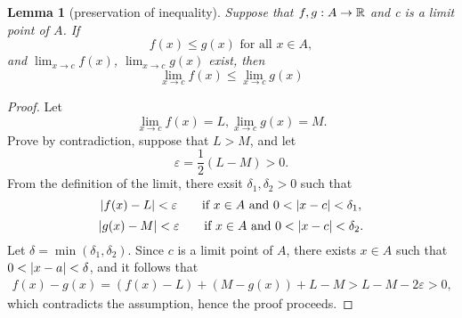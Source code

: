 \documentclass{iitthesis}
\newtheorem{lemma}[theorem]{Lemma}
\theoremstyle{definition}
\begin{document}
\begin{lemma}[preservation of inequality]\label{presofineq}
Suppose that $f, g: A \to \mathbb{R}$ and c is a limit point of $A$. If
\begin{equation*}
f(x) \leq g(x) \text{ for all } x\in A,
\end{equation*}
and $\lim_{x\to c}f(x)$, $\lim_{x\to c} g(x)$ exist, then
$$\lim_{x\to c}f(x)\leq\lim_{x\to c} g(x)$$
\end{lemma}
\begin{proof}
Let
\begin{equation*}
\lim_{x \to c} f(x) =L, \lim_{x \to c}g(x) = M.
\end{equation*}
Prove by contradiction, suppose that $L >M$, and let
$$\varepsilon =\frac12(L-M) >0.$$
From the definition of the limit, there exsit $\delta_1, \delta_2>0$ such that
\begin{equation*}
\left \lvert f(x)-L \right \rvert<\varepsilon \quad \quad \text{if } x \in A \text{ and } 0<\left \lvert x-c \right \rvert<\delta_1,
\end{equation*}
\begin{equation*}
\left \lvert g(x)-M \right \rvert<\varepsilon \quad \quad \text{if } x \in A \text{ and } 0<\left \lvert x-c \right \rvert<\delta_2.
\end{equation*}
Let $\delta=\min(\delta_1,\delta_2)$. Since $c$ is a limit point of $A$, there exists $x \in A$ such that $0<\left \lvert x-a \right \rvert<\delta$, and it follows that
\begin{align*}
f(x)-g(x) = (f(x)-L)+(M-g(x))+L-M >L-M-2\varepsilon>0,
\end{align*}
which contradicts the assumption, hence the proof proceeds.
\end{proof}
\label{chapter:meanMCabsg}
\end{document}
